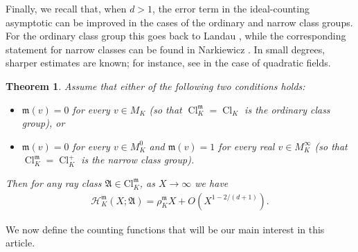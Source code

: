 \documentclass[11pt, reqno]{amsart}
\numberwithin{equation}{section}
\newtheorem{theorem}{Theorem}[section]
\newcommand{\Q}{\mathbb{Q}}
\newcommand{\Cl}{\operatorname{Cl}}
\theoremstyle{definition}
\begin{document}
Finally, we recall that, when $d>1$, the error term in the ideal-counting asymptotic can be improved in the cases of the ordinary and narrow class groups. For the ordinary class group this goes back to Landau \cite[Satz 210]{landau1949}, while the corresponding statement for narrow classes can be found in Narkiewicz \cite[p. 417]{narkiewicz1974}. In small degrees, sharper estimates are known; for instance, see
\cite{huxley1994number} in the case of quadratic fields.

\begin{theorem}\label{thm:Landau-asymptotic-formula}
Assume that either of the following two conditions holds:
\begin{itemize}
    \item[(i)] $\mathfrak{m}(v) = 0$ for every $v \in M_K$ (so that $\Cl_K^{\mathfrak{m}} = \Cl_K$ is the ordinary class group), or
    \item[(ii)] $\mathfrak{m}(v) = 0$ for every $v \in M_K^0$ and $\mathfrak{m}(v) = 1$ for every real $v \in M_K^\infty$ (so that $\Cl_K^{\mathfrak{m}} = \Cl_K^{+}$ is the narrow class group).
\end{itemize}
Then for any ray class $\mathfrak{A} \in \mathrm{Cl}_K^{\mathfrak{m}}$, as $X \to \infty$ we have
\begin{align}\label{eqn:ideal-counting-asymptotic-for-ray-classes-improved}
\mathcal{H}_K^{\mathfrak{m}}(X; \mathfrak{A}) = \rho_{K}^{\mathfrak{m}} X + O(X^{1 - 2/(d+1)}).
\end{align}
\end{theorem}

We now define the counting functions that will be our main interest in this article.
\end{document}
